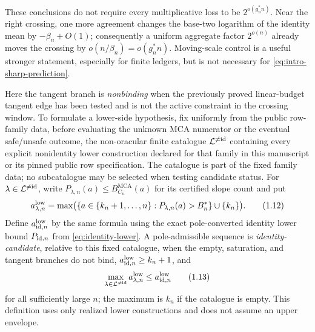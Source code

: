 \documentclass[a4paper,11pt]{amsart}
\theoremstyle{remark}
\DeclareMathOperator{\MCA}{MCA}
\begin{document}
These conclusions do not require every multiplicative loss to be
\(2^{o(g_n^*n)}\).  Near the right crossing, one more agreement changes the
base-two logarithm of the identity mean by \(-\beta_n+O(1)\); consequently a
uniform aggregate factor \(2^{o(n)}\) already moves the crossing by
\(o(n/\beta_n)=o(g_n^*n)\).  Moving-scale control is a useful stronger
statement, especially for finite ledgers, but is not necessary for
\eqref{eq:intro-sharp-prediction}.

Here the tangent branch is \emph{nonbinding} when the previously proved
linear-budget tangent edge has been tested and is not the active constraint
in the crossing window.  To formulate a lower-side hypothesis, fix uniformly
from the public row-family data, before evaluating the unknown MCA numerator
or the eventual safe/unsafe outcome, the non-oracular finite catalogue
\(\mathcal L^{\ne{\rm id}}\) containing every explicit nonidentity lower
construction declared for that family in this manuscript or its pinned
public row specification.  The catalogue is part of the fixed family data;
no subcatalogue may be selected when testing candidate status.
For \(\lambda\in\mathcal L^{\ne{\rm id}}\), write
\(P_{\lambda,n}(a)\le B_{C_n}^{\MCA}(a)\) for its certified slope count and
put
\[
 a_{\lambda,n}^{\rm low}
 =\max\bigl(\{a\in\{k_n+1,\ldots,n\}:
                   P_{\lambda,n}(a)>B_n^*\}\cup\{k_n\}\bigr). \tag{1.12}\label{eq:nonidentity-lower-edge}
\]
Define \(a_{{\rm id},n}^{\rm low}\) by the same formula using the exact
pole-converted identity lower bound \(P_{{\rm id},n}\) from
\eqref{eq:identity-lower}.  A pole-admissible sequence is
\emph{identity-candidate}, relative to this fixed catalogue, when the
empty, saturation, and tangent branches do not bind,
\(a_{{\rm id},n}^{\rm low}\ge k_n+1\), and
\[
 \max_{\lambda\in\mathcal L^{\ne{\rm id}}}
 a_{\lambda,n}^{\rm low}\le a_{{\rm id},n}^{\rm low}           \tag{1.13}\label{eq:identity-candidate-branch}
\]
for all sufficiently large \(n\); the maximum is \(k_n\) if the catalogue
is empty.  This definition uses only realized lower constructions and does
not assume an upper envelope.
\end{document}
